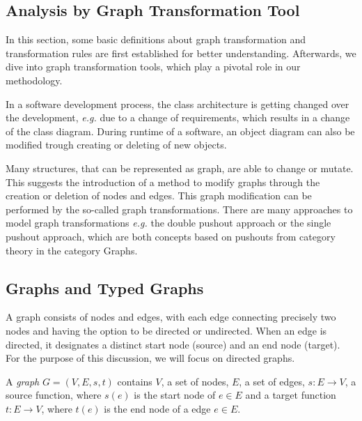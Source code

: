 \subsection{Analysis by Graph Transformation Tool}\label{gts}
In this section, some basic definitions about graph transformation and transformation rules are first established for better understanding. Afterwards, we dive into graph transformation tools, which play a pivotal role in our methodology.

In a software development process, the class architecture is getting changed over the development, \emph{e.g.} due to a change of requirements, which results in a change of the class diagram. During runtime of a software, an object diagram can also be modified trough creating or deleting of new objects.

Many structures, that can be represented as graph, are able to change or mutate. This suggests the introduction of a method to modify graphs through the creation or deletion of nodes and edges. This graph modification can be performed by the so-called graph transformations. There are many approaches to model graph transformations \emph{e.g.} the double pushout approach or the single pushout approach, which are both concepts based on pushouts from category theory in the category Graphs.
\subsection*{Graphs and Typed Graphs}
A graph consists of nodes and edges, with each edge connecting precisely two nodes and having the option to be directed or undirected. When an edge is directed, it designates a distinct start node (source) and an end node (target). For the purpose of this discussion, we will focus on directed graphs.

\begin{definition}
\label{def_graph}
A \emph{graph} $G = (V,E,s,t)$ contains $V$, a set of nodes, $E$, a set of edges, $s: E \to V$, a source function, where $s(e)$ is the start node of $e \in E$ and a target function $t:E \to V$, where $t(e)$ is the end node of a edge $e \in E$.
\end{definition}

